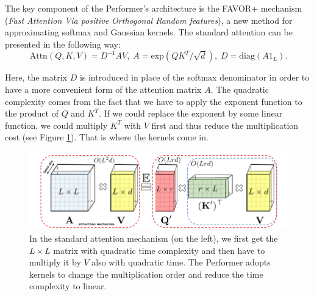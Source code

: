 \documentclass[en]{pracamgr}
\begin{document}
The key component of the Performer's architecture is the FAVOR+ mechanism (\textit{Fast Attention Via positive Orthogonal Random features}), a new method for approximating softmax and Gaussian kernels. The standard attention can be presented in the following way:
\begin{equation}
    \textrm{Attn}(Q, K, V) = D^{-1}AV, \; A=\textrm{exp}\left(QK^T/\sqrt{d}\right), \;
    D = \textrm{diag}\left(A1_{L}\right).
\label{attention_equation}\end{equation}

Here, the matrix $D$ is introduced in place of the softmax denominator in order to have a more convenient form of the attention matrix $A$. The quadratic complexity comes from the fact that we have to apply the exponent function to the product of $Q$ and $K^T$. If we could replace the exponent by some linear function, we could multiply $K^T$ with $V$ first and thus reduce the multiplication cost (see Figure \ref{performer_idea}). That is where the kernels come in.


\begin{figure}[H]
\centering
\includegraphics[scale=0.5]{./images/performer.png}
\caption{In the standard attention mechanism (on the left), we first get the $L\times L$ matrix with quadratic time complexity and then have to multiply it by $V$ also with quadratic time. The Performer adopts kernels to change the multiplication order and reduce the time complexity to linear.}
\label{performer_idea}
\end{figure}
\end{document}
